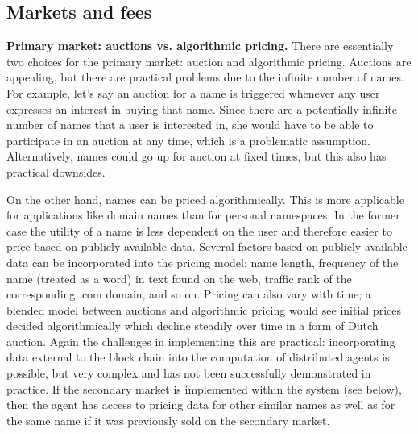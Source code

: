 
\subsection{Markets and fees}

{\bf Primary market: auctions vs. algorithmic pricing.} There are essentially two choices for the primary market: auction and algorithmic pricing. Auctions are appealing, but there are practical problems due to the infinite number of names. For example, let's say an auction for a name is triggered whenever any user expresses an interest in buying that name. Since there are a potentially infinite number of names that a user is interested in, she would have to be able to participate in an auction at any time, which is a problematic assumption. Alternatively, names could go up for auction at fixed times, but this also has practical downsides.

On the other hand, names can be priced algorithmically. This is more applicable for applications like domain names than for personal namespaces. In the former case the utility of a name is less dependent on the user and therefore easier to price based on publicly available data. Several factors based on publicly available data can be incorporated into the pricing model: name length, frequency of the name (treated as a word) in text found on the web,  traffic rank of the corresponding .com domain, and so on. Pricing can also vary with time; a blended model between auctions and algorithmic pricing would see initial prices decided algorithmically which decline steadily over time in a form of Dutch auction. Again the challenges in implementing this are practical: incorporating data external to the block chain into the computation of distributed agents is possible, but very complex and has not been successfully demonstrated in practice. If the secondary market is implemented within the system (see below), then the agent has access to pricing data for other similar names as well as for the same name if it was previously sold on the secondary market.

